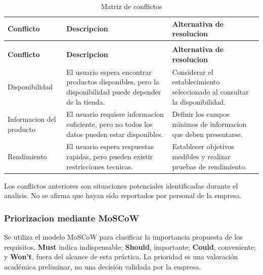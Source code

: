 \documentclass[12pt,a4paper]{article}
\renewcommand{\arraystretch}{1.17}
\begin{document}
\begingroup
\footnotesize
\setlength{\tabcolsep}{3pt}
\renewcommand{\arraystretch}{1.25}
\begin{longtable}{|>{\raggedright\arraybackslash}p{2.65cm}|>{\raggedright\arraybackslash}p{6.05cm}|>{\raggedright\arraybackslash}p{5.65cm}|}
\caption{Matriz de conflictos}\\
\hline
\textbf{Conflicto} &
\textbf{Descripcion} &
\textbf{Alternativa de resolucion} \\
\hline
\endfirsthead
\multicolumn{3}{c}{\textit{Continuación: Matriz de conflictos}}\\
\hline
\textbf{Conflicto} &
\textbf{Descripcion} &
\textbf{Alternativa de resolucion} \\
\hline
\endhead
Disponibilidad &
El usuario espera encontrar productos disponibles,
pero la disponibilidad puede depender de la tienda. &
Considerar el establecimiento seleccionado al
consultar la disponibilidad. \\
\hline
Informacion del producto &
El usuario requiere informacion suficiente,
pero no todos los datos pueden estar disponibles. &
Definir los campos minimos de informacion
que deben presentarse. \\
\hline
Rendimiento &
El usuario espera respuestas rapidas, pero
pueden existir restricciones tecnicas. &
Establecer objetivos medibles y realizar
pruebas de rendimiento. \\
\hline
\end{longtable}
\endgroup

Los conflictos anteriores son situaciones potenciales
identificadas durante el analisis. No se afirma que
hayan sido reportados por personal de la empresa.

\subsubsection{Priorizacion mediante MoSCoW}
Se utiliza el modelo MoSCoW para clasificar la importancia propuesta de los requisitos. \textbf{Must} indica indispensable; \textbf{Should}, importante; \textbf{Could}, conveniente; y \textbf{Won't}, fuera del alcance de esta práctica. La prioridad es una valoración académica preliminar, no una decisión validada por la empresa.
\end{document}
